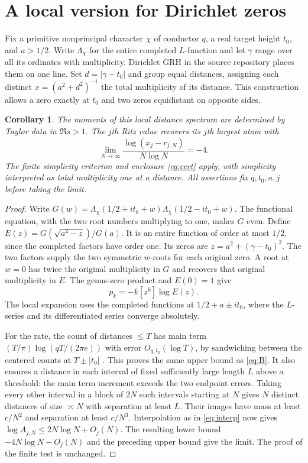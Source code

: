 \documentclass[11pt]{article}
\newtheorem{corollary}[theorem]{Corollary}
\begin{document}
\section{A local version for Dirichlet zeros}
Fix a primitive nonprincipal character $\chi$ of conductor $q$, a real target height $t_0$, and $a>1/2$. Write $\Lambda_\chi$ for the entire completed $L$-function and let $\gamma$ range over all its ordinates with multiplicity. Dirichlet GRH in the source repository places them on one line. Set $d=|\gamma-t_0|$ and group equal distances, assigning each distinct $x=(a^2+d^2)^{-1}$ the total multiplicity of its distance. This construction allows a zero exactly at $t_0$ and two zeros equidistant on opposite sides.
\begin{corollary}\label{cor:dir}
The moments of this local distance spectrum are determined by Taylor data in $\Re s>1$. The $j$th Ritz value recovers its $j$th largest atom with
\[
 \lim_{N\to\infty}\frac{\log(x_j-r_{j,N})}{N\log N}=-4 .
\]
The finite simplicity criterion and enclosure \eqref{eq:cert} apply, with simplicity interpreted as total multiplicity one at a distance. All assertions fix $q,t_0,a,j$ before taking the limit.
\end{corollary}
\begin{proof}
Write $G(w)=\Lambda_\chi(1/2+it_0+w)\Lambda_{\bar\chi}(1/2-it_0+w)$. The functional equation, with the two root numbers multiplying to one, makes $G$ even. Define $E(z)=G(\sqrt{a^2-z})/G(a)$. It is an entire function of order at most $1/2$, since the completed factors have order one. Its zeros are $z=a^2+(\gamma-t_0)^2$. The two factors supply the two symmetric $w$-roots for each original zero. A root at $w=0$ has twice the original multiplicity in $G$ and recovers that original multiplicity in $E$. The genus-zero product and $E(0)=1$ give
\[
 p_k=-k[z^k]\log E(z).
\]
The local expansion uses the completed functions at $1/2+a\pm it_0$, where the $L$-series and its differentiated series converge absolutely.

For the rate, the count of distances $\le T$ has main term $(T/\pi)\log(qT/(2\pi e))$ with error $O_{q,t_0}(\log T)$, by sandwiching between the centered counts at $T\pm|t_0|$ \cite{bennett}. This proves the same upper bound as \eqref{eq:B}. It also ensures a distance in each interval of fixed sufficiently large length $L$ above a threshold: the main term increment exceeds the two endpoint errors. Taking every other interval in a block of $2N$ such intervals starting at $N$ gives $N$ distinct distances of size $\asymp N$ with separation at least $L$. Their images have mass at least $c/N^2$ and separation at least $c/N^3$. Interpolation as in \eqref{eq:interp} now gives $\log A_{j,N}\le 2N\log N+O_j(N)$. The resulting lower bound $-4N\log N-O_j(N)$ and the preceding upper bound give the limit. The proof of the finite test is unchanged.
\end{proof}
\end{document}
